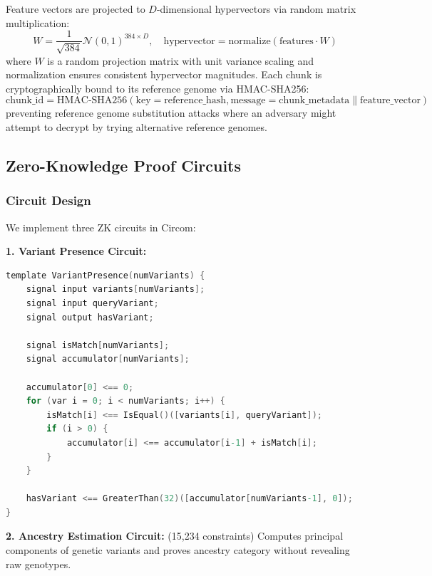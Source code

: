 \documentclass[11pt,letterpaper]{article}
\begin{document}
Feature vectors are projected to $D$-dimensional hypervectors via random matrix multiplication:
\begin{equation}
W = \frac{1}{\sqrt{384}} \mathcal{N}(0, 1)^{384 \times D}, \quad \text{hypervector} = \text{normalize}(\text{features} \cdot W)
\end{equation}
where $W$ is a random projection matrix with unit variance scaling and normalization ensures consistent hypervector magnitudes. Each chunk is cryptographically bound to its reference genome via HMAC-SHA256:
\begin{equation}
\text{chunk\_id} = \text{HMAC-SHA256}(\text{key}=\text{reference\_hash}, \text{message}=\text{chunk\_metadata} \| \text{feature\_vector})
\end{equation}
preventing reference genome substitution attacks where an adversary might attempt to decrypt by trying alternative reference genomes.

\subsection{Zero-Knowledge Proof Circuits}

\subsubsection{Circuit Design}

We implement three ZK circuits in Circom:

\textbf{1. Variant Presence Circuit:}
\begin{lstlisting}[language=C,basicstyle=\ttfamily\small,caption={Circom circuit for variant presence verification}]
template VariantPresence(numVariants) {
    signal input variants[numVariants];
    signal input queryVariant;
    signal output hasVariant;

    signal isMatch[numVariants];
    signal accumulator[numVariants];

    accumulator[0] <== 0;
    for (var i = 0; i < numVariants; i++) {
        isMatch[i] <== IsEqual()([variants[i], queryVariant]);
        if (i > 0) {
            accumulator[i] <== accumulator[i-1] + isMatch[i];
        }
    }

    hasVariant <== GreaterThan(32)([accumulator[numVariants-1], 0]);
}
\end{lstlisting}

\textbf{2. Ancestry Estimation Circuit:} (15,234 constraints) Computes principal components of genetic variants and proves ancestry category without revealing raw genotypes.
\end{document}
